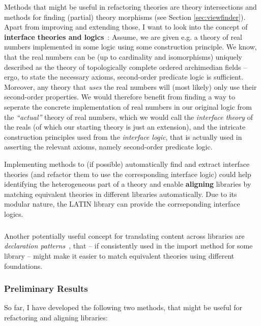Methods that might be useful in refactoring theories are theory intersections and methods for finding (partial) theory morphisms (see Section \ref{sec:viewfinder}). Apart from improving and extending those, I want to look into the concept of \textbf{interface theories and logics}~\cite{KohRabSac:fvip11}: Assume, we are given e.g. a theory of real numbers implemented in some logic using some construction principle. We know, that the real numbers can be (up to cardinality and isomorphisms) uniquely described as the theory of topologically complete ordered archimedian fields -- ergo, to state the necessary axioms, second-order predicate logic is sufficient. Moreover, any theory that \emph{uses} the real numbers will (most likely) only use their second-order properties. We would therefore benefit from finding a way to seperate the concrete implementation of real numbers in our original logic from the \emph{``actual''} theory of real numbers, which we would call the \emph{interface theory} of the reals (of which our starting theory is just an extension), and the intricate construction principles used from the \emph{interface logic}, that is actually used in asserting the relevant axioms, namely second-order predicate logic.

Implementing methods to (if possible) automatically find and extract interface theories (and refactor them to use the corresponding interface logic) could help identifying the heterogeneous part of a theory and enable \textbf{aligning} libraries by matching equivalent theories in different libraries automatically. Due to its modular nature, the LATIN library can provide the corrseponding interface logics.


\subparagraph{} Another potentially useful concept for translating content across libraries are \emph{declaration patterns}~\cite{Horozal:afddl14}, that -- if consistently used in the import method for some library -- might make it easier to match equi\-va\-lent theories using different foundations.

\subsubsection{Preliminary Results}\label{sec:prelim}
So far, I have developed the following two methods, that might be useful for refactoring and aligning libraries:

